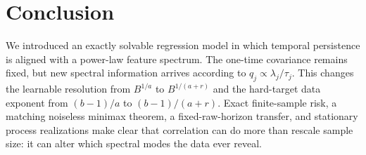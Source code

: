 \section{Conclusion}

We introduced an exactly solvable regression model in which temporal
persistence is aligned with a power-law feature spectrum. The one-time
covariance remains fixed, but new spectral information arrives according to
$q_j\propto\lambda_j/\tau_j$. This changes the learnable resolution from
$B^{1/a}$ to $B^{1/(a+r)}$ and the hard-target data exponent from
$(b-1)/a$ to $(b-1)/(a+r)$. Exact finite-sample risk, a matching noiseless
minimax theorem, a fixed-raw-horizon transfer, and stationary process
realizations make clear that correlation can do more than rescale sample size:
it can alter which spectral modes the data ever reveal.
